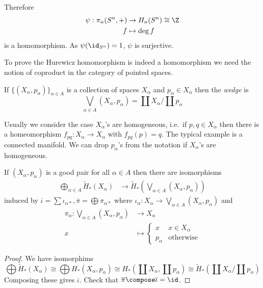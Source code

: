 \documentclass[a4paper]{article}
\begin{document}
Therefore
\begin{align*}
  \psi: \pi_n(S^n, +) &\to H_n(S^n) \cong \Z \\
  f &\mapsto \deg f
\end{align*}
is a homomorphism. As \(\psi(\id_{S^n}) = 1\), \(\psi\) is surjective.

To prove the Hurewicz homomorphism is indeed a homomorphism we need the notion of coproduct in the category of pointed spaces.
\begin{definition}[wedge]
  If \(\{(X_\alpha, p_\alpha)\}_{\alpha \in A}\) is a collection of spaces \(X_\alpha\) and \(p_\alpha \in X_\alpha\) then the \emph{wedge} is
  \[
    \bigvee_{\alpha \in A} (X_\alpha, p_\alpha) = \coprod X_\alpha / \coprod p_\alpha
  \]
\end{definition}
Usually we consider the case \(X_\alpha\)'s are homogeneous, i.e.\ if \(p, q \in X_\alpha\) then there is a homeomorphism \(f_{pq}: X_\alpha \to X_\alpha\) with \(f_{pq}(p) = q\). The typical example is a connected manifold. We can drop \(p_\alpha\)'s from the notation if \(X_\alpha\)'s are homogeneous.

\begin{lemma}
  If \((X_\alpha, p_\alpha)\) is a good pair for all \(\alpha \in A\) then there are isomorphisms
  \begin{align*}
    \bigoplus_{\alpha \in A} \widetilde H_*(X_\alpha) &\to \widetilde H_*(\bigvee_{\alpha \in A} (X_\alpha, p_\alpha))
  \end{align*}
  induced by \(\overline \iota = \sum \iota_{\alpha*}, \overline \pi = \bigoplus \pi_{\alpha*}\) where \(\iota_\alpha: X_\alpha \to \bigvee_{\alpha \in A} (X_\alpha, p_\alpha)\) and
  \begin{align*}
    \pi_\alpha: \bigvee_{\alpha \in A} (X_\alpha, p_\alpha) &\to X_\alpha \\
    x &\mapsto
        \begin{cases}
          x & x \in X_\alpha \\
          p_\alpha & \text{otherwise}
        \end{cases}
  \end{align*}
\end{lemma}

\begin{proof}
  We have isomorphims
  \[
    \bigoplus \widetilde H_*(X_\alpha) \cong \bigoplus H_*(X_\alpha, p_\alpha) \cong H_*(\coprod X_\alpha, \coprod p_\alpha) \cong \widetilde H_*(\coprod X_\alpha/\coprod p_\alpha)
  \]
  Composing these gives \(\overline \iota\). Check that \(\overline \pi \compose \overline \iota = \id\).
\end{proof}
\end{document}
